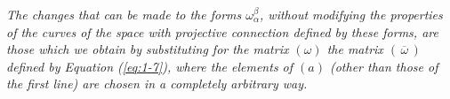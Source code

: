 {\em The changes that can be made to the forms $\omega^\beta_\alpha$, without modifying the properties of the curves of the space with projective connection defined by these forms, are those which we obtain by substituting for the matrix $(\omega)$ the matrix $(\, \overline \omega \,)$ defined by Equation (\ref{eq:1-7}), where the elements of $(a)$ (other than those of the first line) are chosen in a completely arbitrary way.}









































































































